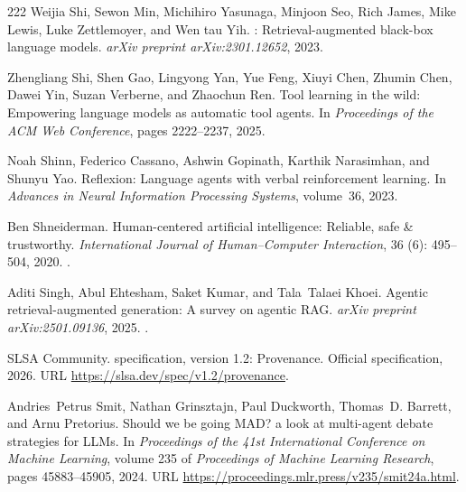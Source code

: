 \begin{thebibliography}{222}
Weijia Shi, Sewon Min, Michihiro Yasunaga, Minjoon Seo, Rich James, Mike Lewis,
  Luke Zettlemoyer, and Wen tau Yih.
: Retrieval-augmented black-box language models.
\newblock \emph{arXiv preprint arXiv:2301.12652}, 2023.

Zhengliang Shi, Shen Gao, Lingyong Yan, Yue Feng, Xiuyi Chen, Zhumin Chen,
  Dawei Yin, Suzan Verberne, and Zhaochun Ren.
\newblock Tool learning in the wild: Empowering language models as automatic
  tool agents.
\newblock In \emph{Proceedings of the ACM Web Conference}, pages 2222--2237,
  2025.

Noah Shinn, Federico Cassano, Ashwin Gopinath, Karthik Narasimhan, and Shunyu
  Yao.
\newblock Reflexion: Language agents with verbal reinforcement learning.
\newblock In \emph{Advances in Neural Information Processing Systems},
  volume~36, 2023.

Ben Shneiderman.
\newblock Human-centered artificial intelligence: Reliable, safe \&
  trustworthy.
\newblock \emph{International Journal of Human--Computer Interaction},
  36 (6): 495--504, 2020.
\newblock {}.

Aditi Singh, Abul Ehtesham, Saket Kumar, and Tala~Talaei Khoei.
\newblock Agentic retrieval-augmented generation: A survey on agentic {RAG}.
\newblock \emph{arXiv preprint arXiv:2501.09136}, 2025.
\newblock {}.

{SLSA Community}.
 specification, version 1.2: Provenance.
\newblock Official specification, 2026.
\newblock URL \url{https://slsa.dev/spec/v1.2/provenance}.

Andries~Petrus Smit, Nathan Grinsztajn, Paul Duckworth, Thomas~D. Barrett, and
  Arnu Pretorius.
\newblock Should we be going {MAD}? a look at multi-agent debate strategies for
  {LLM}s.
\newblock In \emph{Proceedings of the 41st International Conference on Machine
  Learning}, volume 235 of \emph{Proceedings of Machine Learning Research},
  pages 45883--45905, 2024.
\newblock URL \url{https://proceedings.mlr.press/v235/smit24a.html}.


\end{thebibliography}
